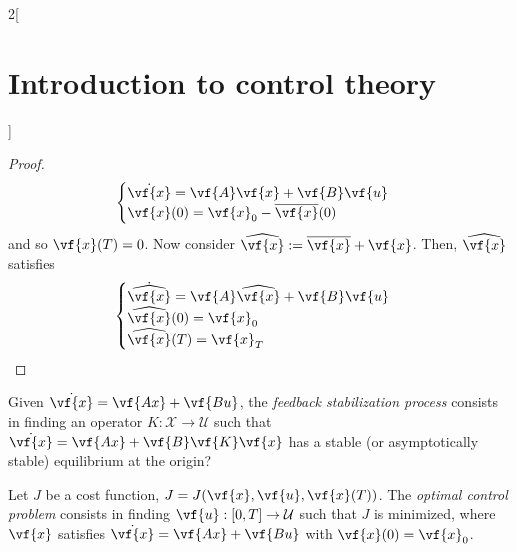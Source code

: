 \documentclass[../../../main_math.tex]{subfiles}
\begin{document}
\begin{multicols}{2}[\section{Introduction to control theory}]
\begin{proof}
    $$
      \begin{cases}
        \dot{\vf{x}} = \vf{A}\vf{x} + \vf{B}\vf{u} \\
        \vf{x}(0) = \vf{x}_0-\overline{\vf{x}}(0)
      \end{cases}
    $$
    and so $\vf{x}(T) = 0$. Now consider $\widehat{\vf{x}}:= \overline{\vf{x}} + \vf{x}$. Then, $\widehat{\vf{x}}$ satisfies
    $$
      \begin{cases}
        \dot{\widehat{\vf{x}}} = \vf{A}\widehat{\vf{x}} + \vf{B}\vf{u} \\
        \widehat{\vf{x}}(0) = \vf{x}_0                                 \\
        \widehat{\vf{x}}(T) = \vf{x}_T
      \end{cases}
    $$
  \end{proof}
  \begin{definition}
    Given $\dot{\vf{x}}=\vf{Ax}+\vf{Bu}$, the \emph{feedback stabilization process} consists in finding an operator $K:\mathcal{X}\to\mathcal{U}$ such that $\dot{\vf{x}}=\vf{Ax}+\vf{B}\vf{K}\vf{x}$ has a stable (or asymptotically stable) equilibrium at the origin?
  \end{definition}
  \begin{definition}
    Let $J$ be a cost function, $J=J(\vf{x}, \vf{u},\vf{x}(T))$. The \emph{optimal control problem} consists in finding $\vf{u}: [0,T]\to \mathcal{U}$ such that $J$ is minimized, where $\vf{x}$ satisfies $\dot{\vf{x}} = \vf{Ax} + \vf{Bu}$ with $\vf{x}(0) = \vf{x}_0$.
  \end{definition}

\end{multicols}
\end{document}
